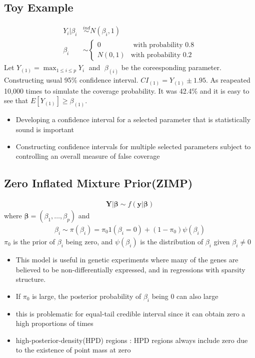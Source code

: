 \documentclass[11pt]{article}
\begin{document}
\subsection{Toy Example}
\begin{align*}
Y_i | \beta_i&  \stackrel{ind}{\sim}N(\beta_i,1)\\
\beta_i& \sim \begin{cases} 0 &\text{ with probability 0.8} \\
N(0,1) &\text{with probability 0.2} \end{cases}
\end{align*}
Let $Y_{(1)} = \max_{1\le i \le p} Y_i\;$ and $\;\beta_{(i)}$ be the coreesponding parameter. 
Constructing usual 95\% confidence interval. $CI_{(1)}=Y_{(1)} \pm 1.95$. As reapeated 10,000 times to simulate the coverage probability. It was 42.4\% and it is easy to see that $E[Y_{(1)}] \ge \beta_{(1)}$.

\begin{itemize}
	\item Developing a confidence interval for a selected parameter that is statistically sound is important
	\item Constructing confidence intervals for multiple selected parameters subject to controlling an overall measure of false coverage
\end{itemize}
\subsection{Zero Inflated Mixture Prior(ZIMP)}
\begin{align*}
\boldsymbol{Y} | \boldsymbol{\beta} \sim f(\boldsymbol{y}|\boldsymbol{\beta})
\end{align*}
where $\boldsymbol{\beta} = (\beta_1, \dots, \beta_p)$ and
\begin{align*}
\beta_i \sim \pi(\beta_i) = \pi_0 1(\beta_i = 0) + (1-\pi_0) \psi(\beta_i)
\end{align*}
$\pi_0$ is the prior of $\beta_i$ being zero, and $\psi(\beta_i)$ is the distribution of $\beta_i$ given $\beta_i \ne 0$
\begin{itemize}
	\item This model is useful in genetic experiments where many of the genes are believed to be non-differentially expressed, and in regressions with sparsity structure.
	\item If $\pi_0$ is large, the posterior probability of $\beta_i$ being 0 can also large
	\item this is problematic for equal-tail credible interval since it can obtain zero a high proportions of times
	\item high-posterior-density(HPD) regions : HPD regions always include zero due to the existence of point mass at zero
\end{itemize}
\end{document}
